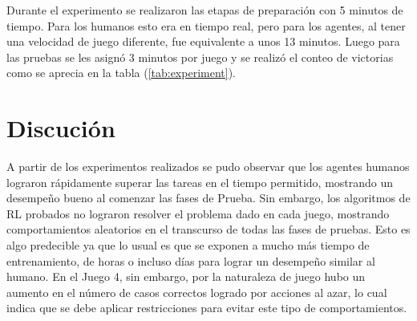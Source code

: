 Durante el experimento se realizaron las etapas de preparación con 5 minutos de tiempo. Para los humanos esto era en tiempo real, pero para los agentes, al tener una velocidad de juego diferente, fue equivalente a unos 13 minutos. Luego para las pruebas se les asignó 3 minutos por juego y se realizó el conteo de victorias como se aprecia en la tabla (\ref{tab:experiment}).
 
\begin{table}[ht!]
    \centering
    \caption{Resultado del experimento en la fase de Prueba. Total de juegos completados correctamente en 3 minutos.}
    \label{tab:experiment}
\end{table}
 
\section{Discución}
 
A partir de los experimentos realizados se pudo observar que los agentes humanos lograron rápidamente superar las tareas en el tiempo permitido, mostrando un desempeño bueno al comenzar las fases de Prueba. Sin embargo, los algoritmos de RL probados no lograron resolver el problema dado en cada juego, mostrando comportamientos aleatorios en el transcurso de todas las fases de pruebas. Esto es algo predecible ya que lo usual es que se exponen a mucho más tiempo de entrenamiento, de horas o incluso días para lograr un desempeño similar al humano. En el Juego 4, sin embargo, por la naturaleza de juego hubo un aumento en el número de casos correctos logrado por acciones al azar, lo cual indica que se debe aplicar restricciones para evitar este tipo de comportamientos.
 
 

